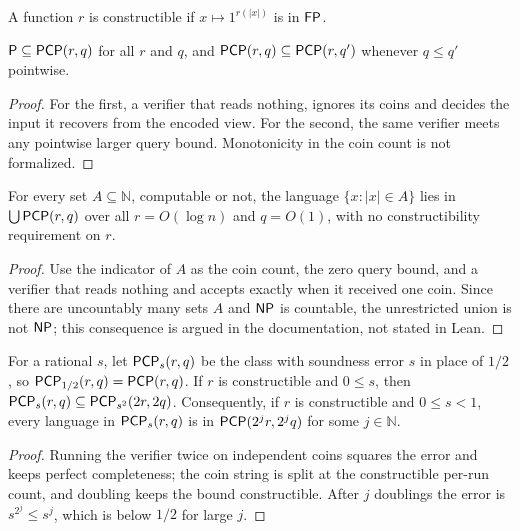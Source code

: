 \begin{definition}
  \label{def:interaction-constructible}
  \leanok
  A function $r$ is constructible if $x \mapsto 1^{r(|x|)}$ is in $\mathsf{FP}$.
\end{definition}

\begin{proposition}
  \label{prop:interaction-P-subset-PCP}
  \leanok
  $\mathsf{P} \subseteq \mathsf{PCP}(r, q)$ for all $r$ and $q$, and
  $\mathsf{PCP}(r, q) \subseteq \mathsf{PCP}(r, q')$ whenever $q \le q'$ pointwise.
\end{proposition}
\begin{proof}
  \leanok
  For the first, a verifier that reads nothing, ignores its coins and decides
  the input it recovers from the encoded view. For the second, the same
  verifier meets any pointwise larger query bound. Monotonicity in the coin
  count is not formalized.
\end{proof}

\begin{proposition}
  \label{prop:interaction-constructible-needed}
  \leanok
  For every set $A \subseteq \mathbb{N}$, computable or not, the language
  $\{x : |x| \in A\}$ lies in $\bigcup \mathsf{PCP}(r, q)$ over all
  $r = O(\log n)$ and $q = O(1)$, with no constructibility requirement on $r$.
\end{proposition}
\begin{proof}
  \leanok
  Use the indicator of $A$ as the coin count, the zero query bound, and a
  verifier that reads nothing and accepts exactly when it received one coin.
  Since there are uncountably many sets $A$
  and $\mathsf{NP}$ is countable, the unrestricted union is not $\mathsf{NP}$; this
  consequence is argued in the documentation, not stated in Lean.
\end{proof}

\begin{lemma}
  \label{lem:interaction-pcp-amplification}
  \leanok
  For a rational $s$, let $\mathsf{PCP}_s(r, q)$ be the class with soundness
  error $s$ in place of $1/2$, so $\mathsf{PCP}_{1/2}(r, q) = \mathsf{PCP}(r, q)$. If
  $r$ is constructible and $0 \le s$, then
  $\mathsf{PCP}_s(r, q) \subseteq \mathsf{PCP}_{s^2}(2r, 2q)$. Consequently, if $r$
  is constructible and $0 \le s < 1$, every language in $\mathsf{PCP}_s(r, q)$ is
  in $\mathsf{PCP}(2^j r, 2^j q)$ for some $j \in \mathbb{N}$.
\end{lemma}
\begin{proof}
  \leanok
  Running the verifier twice on independent coins squares the error and keeps
  perfect completeness; the coin string is split at the constructible per-run
  count, and doubling keeps the bound constructible. After $j$ doublings the
  error is $s^{2^j} \le s^j$, which is below $1/2$ for large $j$.
\end{proof}

